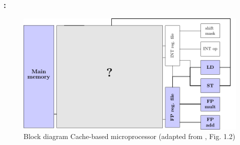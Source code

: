 \documentclass[9pt,xcolor=table]{beamer}
\begin{document}
\begin{frame}
\frametitle{\insertsectionhead{}: \insertsubsection{}}
\begin{figure}[htb]
\includegraphics[height=0.65\textheight]{tikz/cachebased_microprocessor_matrix_memory_as_qm}\\[12pt]\Large
Block diagram Cache-based microprocessor (adapted from \cite{HagerWelleinIntroHPC}, Fig. 1.2)
\end{figure}
\end{frame}
\end{document}
